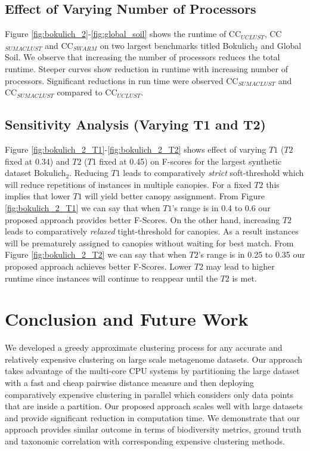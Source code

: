\documentclass[10pt, conference, compsocconf]{IEEEtran}
\begin{document}
\subsection{\textbf{Effect of Varying Number of Processors}}
Figure \ref{fig:bokulich_2}-\ref{fig:global_soil} shows the runtime of CC$_{UCLUST}$, CC$_{SUMACLUST}$ and CC$_{SWARM}$ on two largest benchmarks titled Bokulich$_2$ and Global Soil. We observe that increasing the number of processors reduces the total runtime. Steeper curves show reduction in runtime with increasing number of processors. Significant reductions in run time were observed CC$_{SUMACLUST}$ and CC$_{SUMACLUST}$ compared to CC$_{UCLUST}$.   

\subsection{\textbf{Sensitivity Analysis (Varying T1 and T2)}}
Figure \ref{fig:bokulich_2_T1}-\ref{fig:bokulich_2_T2} shows effect of varying $T1$ ($T2$ fixed at 0.34) and $T2$ ($T1$ fixed at 0.45) on F-scores for the largest synthetic dataset Bokulich$_2$. Reducing $T1$ leads to comparatively \textit{strict} soft-threshold which will reduce repetitions of instances in multiple canopies. For a fixed $T2$ this implies that lower $T1$ will yield better canopy assignment. From Figure \ref{fig:bokulich_2_T1} we can say that when $T1$'s range is in 0.4 to 0.6 our proposed approach provides better F-Scores. On the other hand, increasing $T2$ leads to comparatively \textit{relaxed} tight-threshold for canopies. As a result instances will be prematurely assigned to canopies without waiting for best match. From Figure \ref{fig:bokulich_2_T2} we can say that when $T2$'s range  is in 0.25 to 0.35 our proposed approach achieves better F-Scores. Lower $T2$ may lead to higher runtime since instances will continue to reappear until the $T2$ is met.                   


\section{Conclusion and Future Work}
\label{sec:Conclusion}

We developed a greedy approximate clustering process for any accurate and relatively expensive clustering on large scale metagenome datasets. Our approach takes advantage of the multi-core CPU systems by partitioning the large dataset with a fast and cheap pairwise distance measure and then deploying comparatively expensive clustering in parallel which considers only data points that are inside a partition. Our proposed approach scales well with large datasets and provide significant reduction in computation time. We demonstrate that our approach provides similar outcome in terms of biodiversity metrics, ground truth and taxonomic correlation with corresponding expensive clustering methods.





\end{document}
